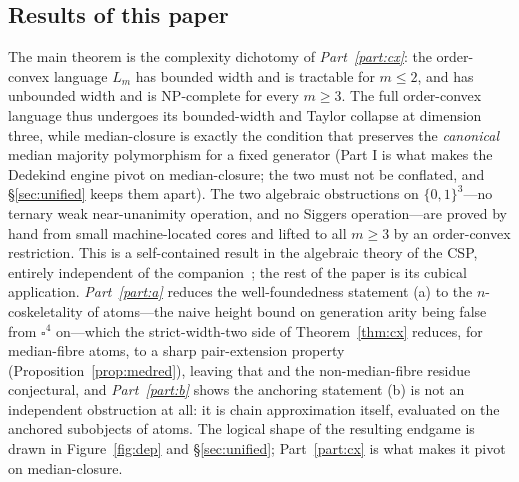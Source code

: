 \documentclass[11pt]{amsart}
\theoremstyle{plain}
\theoremstyle{definition}
\newcommand{\B}{\{0,1\}}
\newcommand{\cube}{\square}
\begin{document}
\subsection*{Results of this paper}
The main theorem is the complexity dichotomy of
\emph{Part~\ref{part:cx}}: the order-convex language $L_m$ has bounded
width and is tractable for $m\le2$, and has unbounded width and is
$\mathrm{NP}$-complete for every $m\ge3$.  The full order-convex language
thus undergoes its bounded-width and Taylor collapse at dimension three,
while median-closure is exactly the condition that preserves the
\emph{canonical} median majority polymorphism for a fixed generator (Part
I is what makes the Dedekind engine pivot on median-closure; the two must
not be conflated, and \S\ref{sec:unified} keeps them apart).  The two
algebraic obstructions on $\B^3$---no ternary weak near-unanimity
operation, and no Siggers operation---are proved by hand from small
machine-located cores and lifted to all $m\ge3$ by an order-convex
restriction.  This is a self-contained result in the algebraic theory of
the CSP, entirely independent of the companion~\cite{PaperW}; the rest of
the paper is its cubical
application.  \emph{Part~\ref{part:a}} reduces the well-foundedness
statement (a) to the $n$-coskeletality of atoms---the naive height bound
on generation arity being false from $\cube^4$ on---which the
strict-width-two side of Theorem~\ref{thm:cx} reduces, for median-fibre
atoms, to a sharp pair-extension property (Proposition~\ref{prop:medred}),
leaving that and the non-median-fibre residue conjectural,
and \emph{Part~\ref{part:b}} shows the anchoring statement (b) is not an
independent obstruction at all: it is chain approximation itself,
evaluated on the anchored subobjects of atoms.  The logical shape of the
resulting endgame is drawn in Figure~\ref{fig:dep} and \S\ref{sec:unified};
Part~\ref{part:cx} is what makes it pivot on median-closure.
\end{document}
